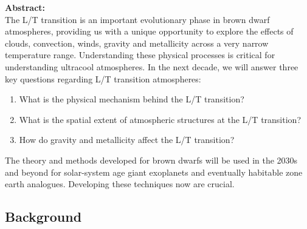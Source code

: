 \documentclass[12pt]{article}
\begin{document}
\begin{justify}
\textbf{Abstract:} \\
 The L/T transition is an important evolutionary phase in brown dwarf atmospheres, providing us with a unique opportunity to explore the effects of clouds, convection, winds, gravity and metallicity across a very narrow temperature range. Understanding these physical processes is critical for understanding ultracool atmospheres. In the next decade, we will answer three key questions regarding L/T transition atmospheres:
 \begin{enumerate}
 \itemsep0em 
\item What is the physical mechanism behind the L/T transition?
\item What is the spatial extent of atmospheric structures at the L/T transition?
\item How do gravity and metallicity affect the L/T transition?
 \end{enumerate}
The theory and methods developed for brown dwarfs will be used in the 2030s and beyond for solar-system age giant exoplanets and eventually habitable zone earth analogues. Developing these techniques now are crucial.
  
 

\pagebreak


\subsection*{Background}



\end{justify}
\end{document}
